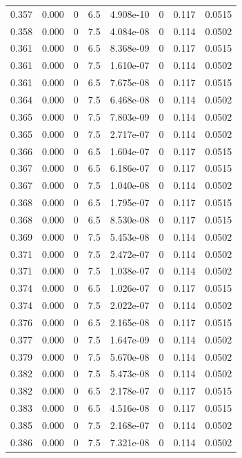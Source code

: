 \documentclass[preview]{standalone}
\begin{document}
{{{{{\begin{tabular}{L{1.2cm}C{1.2cm} C{0.3cm}C{0.5cm} C{1.4cm}C{1.4cm} C{1.4cm}C{1.4cm}}
  0.357  &  0.000  & 0     & 6.5 &  4.908e-10  & 0  & 0.117 &  0.0515   \\ 
  0.358  &  0.000  & 0     & 7.5 &  4.084e-08  & 0  & 0.114 &  0.0502   \\ 
  0.361  &  0.000  & 0     & 6.5 &  8.368e-09  & 0  & 0.117 &  0.0515   \\ 
  0.361  &  0.000  & 0     & 7.5 &  1.610e-07  & 0  & 0.114 &  0.0502   \\ 
  0.361  &  0.000  & 0     & 6.5 &  7.675e-08  & 0  & 0.117 &  0.0515   \\ 
  0.364  &  0.000  & 0     & 7.5 &  6.468e-08  & 0  & 0.114 &  0.0502   \\ 
  0.365  &  0.000  & 0     & 7.5 &  7.803e-09  & 0  & 0.114 &  0.0502   \\ 
  0.365  &  0.000  & 0     & 7.5 &  2.717e-07  & 0  & 0.114 &  0.0502   \\ 
  0.366  &  0.000  & 0     & 6.5 &  1.604e-07  & 0  & 0.117 &  0.0515   \\ 
  0.367  &  0.000  & 0     & 6.5 &  6.186e-07  & 0  & 0.117 &  0.0515   \\ 
  0.367  &  0.000  & 0     & 7.5 &  1.040e-08  & 0  & 0.114 &  0.0502   \\ 
  0.368  &  0.000  & 0     & 6.5 &  1.795e-07  & 0  & 0.117 &  0.0515   \\ 
  0.368  &  0.000  & 0     & 6.5 &  8.530e-08  & 0  & 0.117 &  0.0515   \\ 
  0.369  &  0.000  & 0     & 7.5 &  5.453e-08  & 0  & 0.114 &  0.0502   \\ 
  0.371  &  0.000  & 0     & 7.5 &  2.472e-07  & 0  & 0.114 &  0.0502   \\ 
  0.371  &  0.000  & 0     & 7.5 &  1.038e-07  & 0  & 0.114 &  0.0502   \\ 
  0.374  &  0.000  & 0     & 6.5 &  1.026e-07  & 0  & 0.117 &  0.0515   \\ 
  0.374  &  0.000  & 0     & 7.5 &  2.022e-07  & 0  & 0.114 &  0.0502   \\ 
  0.376  &  0.000  & 0     & 6.5 &  2.165e-08  & 0  & 0.117 &  0.0515   \\ 
  0.377  &  0.000  & 0     & 7.5 &  1.647e-09  & 0  & 0.114 &  0.0502   \\ 
  0.379  &  0.000  & 0     & 7.5 &  5.670e-08  & 0  & 0.114 &  0.0502   \\ 
  0.382  &  0.000  & 0     & 7.5 &  5.473e-08  & 0  & 0.114 &  0.0502   \\ 
  0.382  &  0.000  & 0     & 6.5 &  2.178e-07  & 0  & 0.117 &  0.0515   \\ 
  0.383  &  0.000  & 0     & 6.5 &  4.516e-08  & 0  & 0.117 &  0.0515   \\ 
  0.385  &  0.000  & 0     & 7.5 &  2.168e-07  & 0  & 0.114 &  0.0502   \\ 
  0.386  &  0.000  & 0     & 7.5 &  7.321e-08  & 0  & 0.114 &  0.0502   \\ 
\hline 
\end{tabular} 

}}}}}
\end{document}
